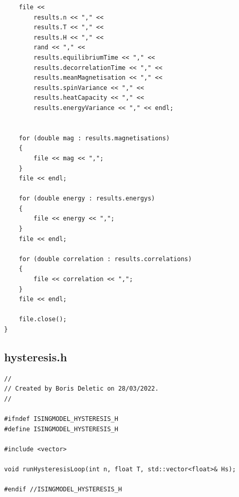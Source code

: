 \documentclass[a4paper, 12pt]{article}
\begin{document}
\begin{lstlisting}
    file <<
        results.n << "," <<
        results.T << "," <<
        results.H << "," <<
        rand << "," <<
        results.equilibriumTime << "," <<
        results.decorrelationTime << "," <<
        results.meanMagnetisation << "," <<
        results.spinVariance << "," <<
        results.heatCapacity << "," <<
        results.energyVariance << "," << endl;


    for (double mag : results.magnetisations)
    {
        file << mag << ",";
    }
    file << endl;

    for (double energy : results.energys)
    {
        file << energy << ",";
    }
    file << endl;

    for (double correlation : results.correlations)
    {
        file << correlation << ",";
    }
    file << endl;

    file.close();
}
\end{lstlisting}


\newpage
\subsection{hysteresis.h}
\begin{lstlisting}
//
// Created by Boris Deletic on 28/03/2022.
//

#ifndef ISINGMODEL_HYSTERESIS_H
#define ISINGMODEL_HYSTERESIS_H

#include <vector>

void runHysteresisLoop(int n, float T, std::vector<float>& Hs);

#endif //ISINGMODEL_HYSTERESIS_H

\end{lstlisting}



\newpage
\end{document}
